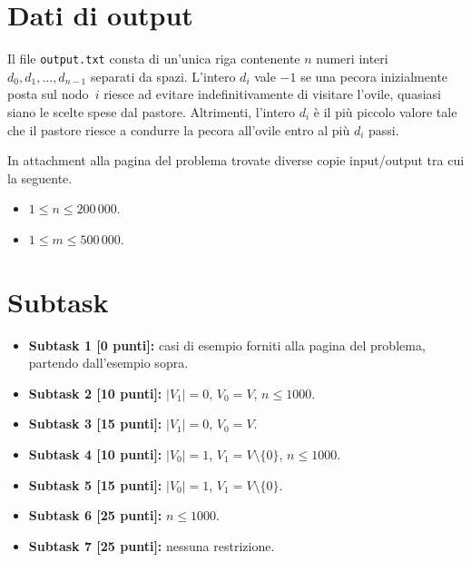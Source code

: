 \section*{Dati di output}
Il file \verb'output.txt' consta di un'unica riga contenente
$n$ numeri interi  $d_0, d_1, \ldots, d_{n-1}$ separati da spazi.
L'intero $d_i$ vale $-1$ se una pecora inizialmente posta sul nodo~$i$ riesce ad evitare indefinitivamente di visitare l'ovile, quasiasi siano le scelte spese dal pastore. Altrimenti, l'intero $d_i$ è il più piccolo valore tale che il pastore riesce a condurre la pecora all'ovile entro al più $d_i$ passi.  



In attachment alla pagina del problema trovate diverse copie input/output tra cui la seguente.
\vspace{0.5cm}

\esempio{

}{}


\begin{itemize}[nolistsep, noitemsep]
  \item $1 \leq n \leq 200\,000$.
  \item $1 \leq m \leq 500\,000$.
\end{itemize}
  
\section*{Subtask}
\begin{itemize}
  \item \textbf{Subtask 1 [0 punti]:} casi di esempio forniti alla pagina del problema, partendo dall'esempio sopra.
  \item \textbf{Subtask 2 [10 punti]:} $|V_1| = 0$, $V_0 = V$, $n \leq 1000$.
  \item \textbf{Subtask 3 [15 punti]:} $|V_1| = 0$, $V_0 = V$.
  \item \textbf{Subtask 4 [10 punti]:} $|V_0| = 1$, $V_1 = V\setminus \{0\}$, $n \leq 1000$.
  \item \textbf{Subtask 5 [15 punti]:} $|V_0| = 1$, $V_1 = V\setminus \{0\}$.
  \item \textbf{Subtask 6 [25 punti]:} $n \leq 1000$.
  \item \textbf{Subtask 7 [25 punti]:} nessuna restrizione.
\end{itemize}
